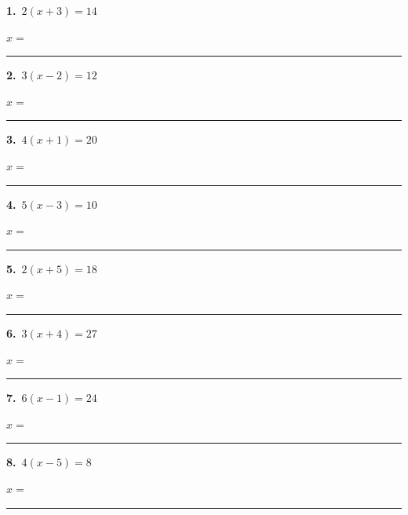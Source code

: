 \documentclass[11pt,letterpaper]{article}
\begin{document}
\needspace{3.5cm}\par\vspace{3mm}\noindent \begin{minipage}[t][3.0cm]{0.48\linewidth}\raggedright{\color{fmturn}\bfseries 1.}\ $2(x + 3) = 14$\par\vfill\hfill $x = $\ \rule{3.2cm}{0.4pt}\end{minipage}\hfill \begin{minipage}[t][3.0cm]{0.48\linewidth}\raggedright{\color{fmturn}\bfseries 2.}\ $3(x - 2) = 12$\par\vfill\hfill $x = $\ \rule{3.2cm}{0.4pt}\end{minipage}\par
\needspace{3.5cm}\par\vspace{3mm}\noindent \begin{minipage}[t][3.0cm]{0.48\linewidth}\raggedright{\color{fmturn}\bfseries 3.}\ $4(x + 1) = 20$\par\vfill\hfill $x = $\ \rule{3.2cm}{0.4pt}\end{minipage}\hfill \begin{minipage}[t][3.0cm]{0.48\linewidth}\raggedright{\color{fmturn}\bfseries 4.}\ $5(x - 3) = 10$\par\vfill\hfill $x = $\ \rule{3.2cm}{0.4pt}\end{minipage}\par
\needspace{3.5cm}\par\vspace{3mm}\noindent \begin{minipage}[t][3.0cm]{0.48\linewidth}\raggedright{\color{fmturn}\bfseries 5.}\ $2(x + 5) = 18$\par\vfill\hfill $x = $\ \rule{3.2cm}{0.4pt}\end{minipage}\hfill \begin{minipage}[t][3.0cm]{0.48\linewidth}\raggedright{\color{fmturn}\bfseries 6.}\ $3(x + 4) = 27$\par\vfill\hfill $x = $\ \rule{3.2cm}{0.4pt}\end{minipage}\par
\needspace{3.5cm}\par\vspace{3mm}\noindent \begin{minipage}[t][3.0cm]{0.48\linewidth}\raggedright{\color{fmturn}\bfseries 7.}\ $6(x - 1) = 24$\par\vfill\hfill $x = $\ \rule{3.2cm}{0.4pt}\end{minipage}\hfill \begin{minipage}[t][3.0cm]{0.48\linewidth}\raggedright{\color{fmturn}\bfseries 8.}\ $4(x - 5) = 8$\par\vfill\hfill $x = $\ \rule{3.2cm}{0.4pt}\end{minipage}\par
\end{document}
